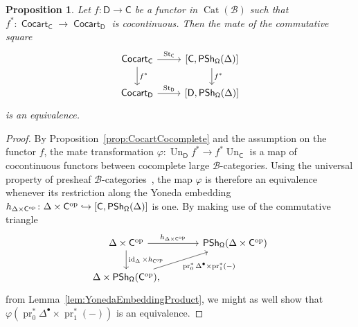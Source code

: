 \documentclass[reqno]{amsart}
\numberwithin{equation}{subsection}
\theoremstyle{plain}
\newtheorem{proposition}[equation]{Proposition}
\theoremstyle{definition}
\let\scr=\mathcal
\let\phi=\varphi
\let\into=\hookrightarrow
\def\BB{\scr B}
\DeclareMathOperator{\id}{id}
\DeclareMathOperator{\IPSh}{\mathsf{PSh}}
\DeclareMathOperator{\Cat}{Cat}
\DeclareMathOperator{\ICocart}{\mathsf{Cocart}}
\DeclareMathOperator{\pr}{pr}
\DeclareMathOperator{\St}{St}
\DeclareMathOperator{\Un}{Un}
\newcommand{\op}{\mathrm{op}}
\newcommand{\I}[1]{\mathsf{#1}}
\newcommand{\iFun}[2]{{[#1,#2]}}
\begin{document}
\begin{proposition}
	\label{prop:CocartBCCocontinuousMate}
	Let $f\colon \I{D}\to\I{C}$ be a functor in $\Cat(\BB)$ such that $f^\ast\colon \ICocart_{\I{C}}\to\ICocart_{\I{D}}$ is cocontinuous. Then the mate of the commutative square
	\begin{equation*}
	\begin{tikzcd}
	\ICocart_{\I{C}}\arrow[r, "\St_{\I{C}}"]\arrow[d, "f^\ast"] & \iFun{\I{C}}{\IPSh_{\Univ}(\Delta)}\arrow[d, "f^\ast"]\\
	\ICocart_{\I{D}}\arrow[r, "\St_{\I{D}}"] & \iFun{\I{D}}{\IPSh_{\Univ}(\Delta)}
	\end{tikzcd}
	\end{equation*}
	is an equivalence.
\end{proposition}
\begin{proof}
	By Proposition~\ref{prop:CocartCocomplete} and the assumption on the functor $f$, the mate transformation $\phi\colon \Un_{\I{D}}f^\ast\to f^\ast\Un_{\I{C}}$ is a map of cocontinuous functors between cocomplete large $\BB$-categories. Using the universal property of presheaf $\BB$-categories~\cite[Theorem~7.1.1]{Martini2021a}, the map $\phi$ is therefore an equivalence whenever its restriction along the Yoneda embedding $h_{\Delta\times\I{C}^{\op}}\colon \Delta\times\I{C}^{\op}\into\iFun{\I{C}}{\IPSh_{\Univ}(\Delta)}$ is one.  By making use of the commutative triangle
	\begin{equation*}
	\begin{tikzcd}[column sep=large]
		\Delta\times\I{C}^{\op}\arrow[r, "{h_{\Delta\times\I{C}^{\op}}}"]\arrow[d, "\id_{\Delta}\times h_{\I{C}^{\op}}"] & \IPSh_{\Univ}(\Delta\times\I{C}^{\op})\\
		\Delta\times\IPSh_{\Univ}(\I{C}^{\op}),\arrow[ur, "\pr_0^\ast\Delta^\bullet\times\pr_1^\ast(-)"'] &
	\end{tikzcd}
	\end{equation*}
	from Lemma~\ref{lem:YonedaEmbeddingProduct}, we might as well show that $\phi (\pr_0^\ast\Delta^{\bullet}\times\pr_1^\ast(-))$ is an equivalence. 
	

\end{proof}
\end{document}
